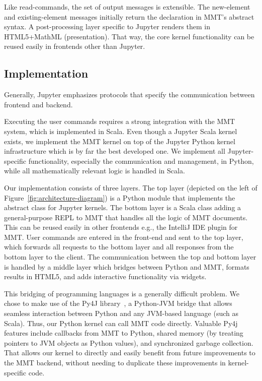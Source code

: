 Like read-commands, the set of output messages is extensible.
The new-element and existing-element messages initially return the declaration in MMT's abstract syntax.
A post-processing layer specific to Jupyter renders them in HTML5+MathML (presentation).
That way, the core kernel functionality can be reused easily in frontends other than Jupyter.

\subsection{Implementation}\label{sec:kernel:impl}

Generally, Jupyter emphasizes protocols that specify the communication between frontend and backend. 

Executing the user commands requires a strong integration with the MMT system, which is implemented in Scala.
Even though a Jupyter Scala kernel exists, we implement the MMT kernel on top of the Jupyter Python kernel infrastructure which is by far the best developed one. 
We implement all Jupyter-specific functionality, especially the communication and management, in Python, while all mathematically relevant logic is handled in Scala.

Our implementation consists of three layers.
The top layer (depicted on the left of Figure~\ref{fig:architecture-diagram}) is a Python module that implements the abstract class for Jupyter kernels.
The bottom layer is a Scala class adding a general-purpose REPL to MMT that handles all the logic of MMT documents.
This can be reused easily in other frontends e.g., the IntelliJ IDE plugin for MMT.
User commands are entered in the front-end and sent to the top layer, which forwards all requests to the bottom layer and all responses from the bottom layer to the client.
The communication between the top and bottom layer is handled by a middle layer which bridges between Python and MMT, formats results in HTML5, and adds interactive functionality via widgets.


This bridging of programming languages is a generally difficult problem. 
We chose to make use of the Py4J library~\cite{Py4J:on}, a Python-JVM bridge that allows seamless interaction between Python and any JVM-based language (such as Scala).
Thus, our Python kernel can call MMT code directly.
Valuable Py4j features include callbacks from MMT to Python, shared memory (by treating pointers to JVM objects as Python values), and synchronized garbage collection.
That allows our kernel to directly and easily benefit from future improvements to the MMT backend, without needing to duplicate these improvements in kernel-specific code. 

